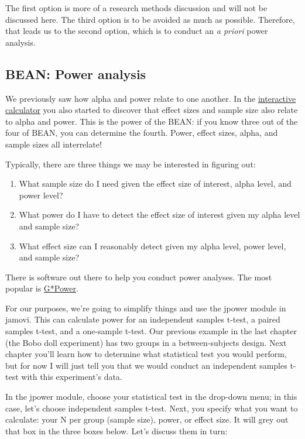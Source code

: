 \documentclass[
]{book}
\providecommand{\tightlist}{%
  \setlength{\itemsep}{0pt}\setlength{\parskip}{0pt}}
\begin{document}
The first option is more of a research methods discussion and will not be discussed here. The third option is to be avoided as much as possible. Therefore, that leads us to the second option, which is to conduct an \emph{a priori} power analysis.

\hypertarget{bean-power-analysis}{%
\subsection{BEAN: Power analysis}\label{bean-power-analysis}}

We previously saw how alpha and power relate to one another. In the \href{https://rpsychologist.com/d3/pdist/}{interactive calculator} you also started to discover that effect sizes and sample size also relate to alpha and power. This is the power of the BEAN: if you know three out of the four of BEAN, you can determine the fourth. Power, effect sizes, alpha, and sample sizes all interrelate!

Typically, there are three things we may be interested in figuring out:

\begin{enumerate}
\def\labelenumi{\arabic{enumi}.}
\tightlist
\item
  What sample size do I need given the effect size of interest, alpha level, and power level?
\item
  What power do I have to detect the effect size of interest given my alpha level and sample size?
\item
  What effect size can I reasonably detect given my alpha level, power level, and sample size?
\end{enumerate}

There is software out there to help you conduct power analyses. The most popular is \href{https://www.psychologie.hhu.de/arbeitsgruppen/allgemeine-psychologie-und-arbeitspsychologie/gpower.html}{G*Power}.

For our purposes, we're going to simplify things and use the jpower module in jamovi. This can calculate power for an independent samples t-test, a paired samples t-test, and a one-sample t-test. Our previous example in the last chapter (the Bobo doll experiment) has two groups in a between-subjects design. Next chapter you'll learn how to determine what statistical test you would perform, but for now I will just tell you that we would conduct an independent samples t-test with this experiment's data.

In the jpower module, choose your statistical test in the drop-down menu; in this case, let's choose independent samples t-test. Next, you specify what you want to calculate: your N per group (sample size), power, or effect size. It will grey out that box in the three boxes below. Let's discuss them in turn:
\end{document}
